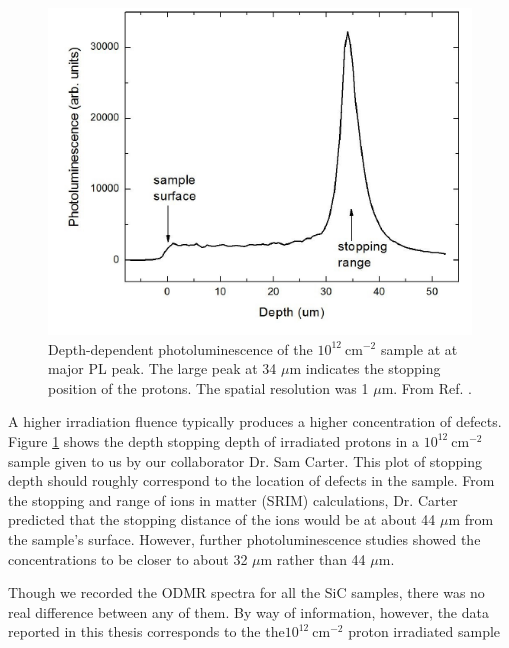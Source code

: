\documentclass[oneside]{BYUPhys}
\begin{document}
\begin{figure}[t]
    \centerline{\includegraphics{srim_fig}}
    \caption[SiC Depth-Dependent Photoluminescence]{\label{fig:SiCDepth}
     Depth-dependent photoluminescence of the $10^{12}~\text{cm}^{−2}$ sample at at major PL peak. The large peak at 34 $\mu$m indicates the stopping position of the protons. The spatial resolution was 1 $\mu$m. From Ref. .}
 \end{figure}

A higher irradiation fluence typically produces a higher concentration of defects. Figure \ref{fig:SiCDepth} shows the depth stopping depth of irradiated protons in a $10^{12}~\text{cm}^{-2}$ sample given to us by our collaborator Dr. Sam Carter. This plot of stopping depth should roughly correspond to the location of defects in the sample. From the stopping and range of ions in matter (SRIM) calculations, Dr. Carter predicted that the stopping distance of the ions would be at about 44 $\mu$m from the sample's surface. However, further photoluminescence studies showed the concentrations to be closer to about 32 $\mu$m rather than 44 $\mu$m. 

Though we recorded the ODMR spectra for all the SiC samples, there was no real difference between any of them. By way of information, however, the data reported in this thesis corresponds to the the$10^{12}~\text{cm}^{-2}$ proton irradiated sample
\end{document}
